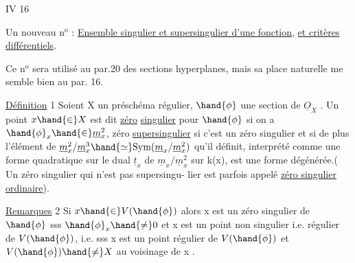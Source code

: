 
IV 16

Un nouveau n$^{\text{o}}$ : \uline{Ensemble singulier et supersingulier d'une fonction},
\uline{et critères différentiels}.

Ce n$^{\text{o}}$ sera utilisé au par.20 des sections hyperplanes, mais sa
place naturelle me semble bien au par. 16.

\uline{Définition} 1 Soient X un préschéma régulier, $\hand{\phi}$ une section de $\underline{O}_X$ . Un
point $x \hand{\in} X$ est dit \uline{zéro}  \uline{singulier} pour $\hand{\phi}$
si on a $\hand{\phi}_x \hand{\in} \underline{m}_x^2$, zéro \uline{supersingulier} si c'est un zéro singulier
et si de plus l'élément de $\underline{m}_x^2/\underline{m}_x^3 \hand{\simeq} \mathrm{Sym}(\underline{m}_x/\underline{m}_x^2)$ qu'il définit,
interprété comme une forme quadratique sur le dual $\underline{t}_x$ de $\underline{m}_x/\underline{m}_x^2$ sur k(x),
est une forme  dégénérée.( Un zéro singulier qui n'est pas supersingu-%
lier est parfois appelé \uline{zéro singulier ordinaire}).

\uline{Remarques} 2 Si $x \hand{\in} V(\hand{\phi})$\hand{,} alors x est un zéro  singulier de $\hand{\phi}$ sss
$\hand{\phi}_x \hand{\neq} 0$ et x est un point  non singulier i.e. régulier de $V(\hand{\phi})$,
i.e. sss x est un point régulier de $V(\hand{\phi})$ et $V(\hand{\phi}) \hand{\neq} X$ au voisinage de
x . 

